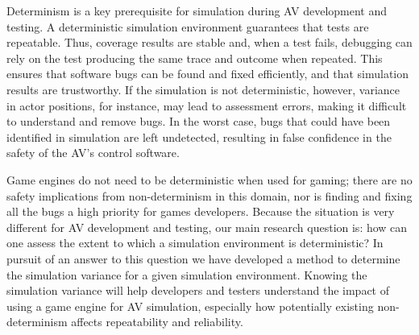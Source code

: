 \documentclass[letterpaper, 10 pt, journal, twoside]{IEEEtran}
\begin{document}
Determinism is a key prerequisite for simulation during AV development and testing. 
%
A deterministic simulation environment guarantees that tests are repeatable. 
%
Thus, coverage results are stable and, when a test fails, debugging can rely on the test producing the same trace and outcome when repeated. This ensures that software bugs can be found and fixed efficiently, and that simulation results are trustworthy. 
%
%
If the simulation is not deterministic, however, variance in actor positions, for instance, may lead to assessment errors, making it difficult to understand and remove bugs. In the worst case, bugs that could have been identified in simulation are left undetected, resulting in false confidence in the safety of the AV's control software.

Game engines do not need to be deterministic when used for gaming; there are no safety implications from non-determinism in this domain, nor is finding and fixing all the bugs a high priority for games developers. Because the situation is very different for AV development and testing, our main research question is: 
how can one assess the extent to which a simulation environment is deterministic? 
%
In pursuit of an answer to this question we have developed a method to determine the simulation variance for a given simulation environment. 
%
Knowing the simulation variance will help developers and testers understand the impact of using a game engine for AV simulation, especially how potentially existing non-determinism affects repeatability and reliability.
%
\end{document}
